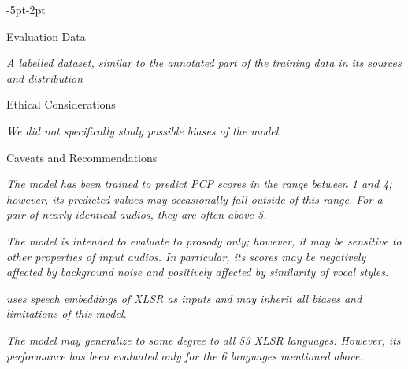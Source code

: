 \begin{adjustwidth}{-5pt}{-2pt}
\begin{singlespace}
\begin{tcolorbox}[title=\textbf{
    \section{Model Card - \comparator}
    \label{app:comparator_model_card}
},
breakable, sharp corners, boxrule=0.5pt]
\begin{mcsection}{Evaluation Data}
\item \textit{A labelled dataset, similar to the annotated part of the training data in its sources and distribution}
\end{mcsection}


\begin{mcsection}{Ethical Considerations}
\item \textit{We did not specifically study possible biases of the model.
} 
\end{mcsection}


\begin{mcsection}{Caveats and Recommendations}
  \item \textit{The model has been trained to predict PCP scores in the range between 1 and 4; however, its predicted values may occasionally fall outside of this range. For a pair of nearly-identical audios, they are often above 5.}
  \item \textit{The model is intended to evaluate to prosody only; however, it may be sensitive to other properties of input audios. In particular, its scores may be negatively affected by background noise and positively affected by similarity of vocal styles.}
  \item \textit{\comparator uses speech embeddings of XLSR \citep{conneau2020unsupervised} as inputs and may inherit all biases and limitations of this model.}
  \item \textit{The model may generalize to some degree to all 53 XLSR languages. However, its performance has been evaluated only for the 6 languages mentioned above.}
\end{mcsection}


\end{tcolorbox}
\end{singlespace}
\end{adjustwidth}
